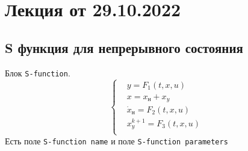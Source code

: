 
\section{Лекция от 29.10.2022}
\subsection{S функция для непрерывного состояния}
Блок \verb!S-function!.
\[
  \left\{\begin{aligned} 
    &y = F_1(t, x, u)\\
    &x = x_{н} + x_y\\
    &\dot x_{н} = F_2 (t, x, u)\\
    &x_y ^{k+1} = F_3(t, x, u) \\
  \end{aligned}\right. 
\] 
Есть поле \verb!S-function name! и поле \verb!S-function parameters!\par

